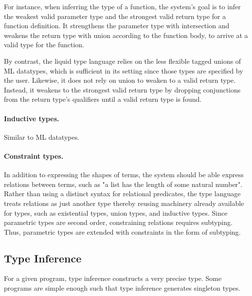 \documentclass[acmsmall]{acmart}
\theoremstyle{definition}
\begin{document}
For instance, when inferring the type of a function, 
the system's goal is to infer the weakest valid parameter type and the strongest valid return type for a function definition.
It strengthens the parameter type with intersection and weakens the return type with union according to the function body,
to arrive at a valid type for the function.  

By contrast, the liquid type language relies on the less flexible tagged unions of ML datatypes, 
which is sufficient in its setting since those types are specified by the user. 
Likewise, it does not rely on union to weaken to a valid return type. 
Instead, it weakens to the strongest valid return type by dropping conjunctions from 
the return type's qualifiers until a valid return type is found.

\paragraph{Inductive types.} Similar to ML datatypes.

\paragraph{Constraint types.}
In addition to expressing the shapes of terms, the system should be able express relations between terms,
such as "a list has the length of some natural number".
Rather than using a distinct syntax for relational predicates, 
the type language treats relations as just another type thereby reusing machinery already 
available for types, such as existential types, union types, and inductive types.
Since parametric types are second order, constraining relations requires subtyping.
Thus, parametric types are extended with constraints in the form of subtyping.

\subsection{Type Inference}

For a given program, type inference constructs a very precise type. Some programs are simple enough
such that type inference generates singleton types. 



\end{document}
